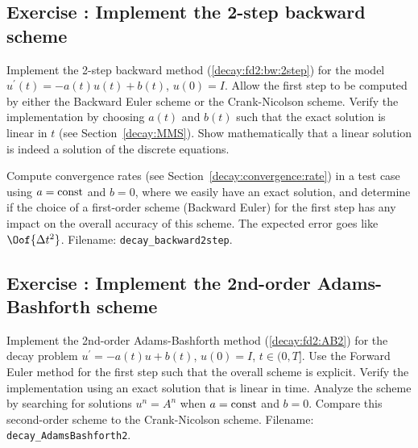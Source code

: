 \documentclass[graybox,sectrefs,envcountresetchap,open=right,final]{svmonodo}
\newenvironment{doconceexercise}{}{}
\newcounter{doconceexercisecounter}
\begin{document}
\begin{doconceexercise}

\subsection*{Exercise \thedoconceexercisecounter: Implement the 2-step backward scheme}

\label{decay:fd2:exer:bw2}

Implement the 2-step backward method (\ref{decay:fd2:bw:2step}) for the
model $u^{\prime}(t) = -a(t)u(t) + b(t)$, $u(0)=I$.  Allow the first step to
be computed by either the Backward Euler scheme or the Crank-Nicolson
scheme. Verify the implementation by choosing $a(t)$ and $b(t)$ such
that the exact solution is linear in $t$ (see Section~\ref{decay:MMS}). Show mathematically that a linear solution is indeed a
solution of the discrete equations.

Compute convergence rates (see Section~\ref{decay:convergence:rate}) in
a test case using $a=\hbox{const}$ and $b=0$, where we easily have an exact
solution, and determine if the choice of a first-order scheme
(Backward Euler) for the first step has any impact on the overall
accuracy of this scheme. The expected error goes like $\Oof{\Delta t^2}$.
\noindent Filename: \Verb!decay_backward2step!.

\end{doconceexercise}




\begin{doconceexercise}

\subsection*{Exercise \thedoconceexercisecounter: Implement the 2nd-order Adams-Bashforth scheme}

\label{decay:fd2:exer:AB2}

Implement the 2nd-order Adams-Bashforth method (\ref{decay:fd2:AB2})
for the decay problem $u^{\prime}=-a(t)u + b(t)$, $u(0)=I$, $t\in (0, T]$.
Use the Forward Euler method for the first step such that the overall
scheme is explicit. Verify the implementation using an exact
solution that is linear in time.
Analyze the scheme by searching for solutions $u^n=A^n$ when $a=\hbox{const}$
and $b=0$. Compare this second-order scheme to the Crank-Nicolson scheme.
\noindent Filename: \Verb!decay_AdamsBashforth2!.

\end{doconceexercise}
\end{document}
